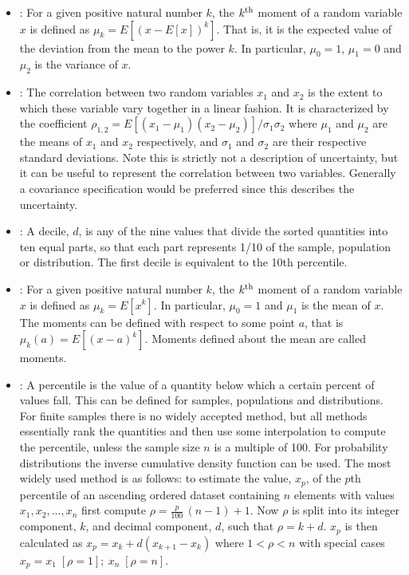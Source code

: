 \documentclass[draftspec]{sbmlpkgspec}
\begin{document}
\begin{itemize}
\item {}:  For a given positive natural number $ k $, the $ k\textsuperscript{th} $  moment of a random variable $ x $ is defined as $ \mu_k = E[(x - E[x])^k] $. That is, it is the expected value of the deviation from the mean to the power $ k $. In particular, $ \mu_0 = 1 $, $ \mu_1 = 0 $ and $ \mu_2 $ is the variance of $ x $.

\item {}:  The correlation between two random variables $ x_1 $ and $ x_2 $ is the extent to which these variable vary together in a linear fashion. It is characterized by the coefficient $ \rho_{1,2} = E[(x_1-\mu_1)(x_2-\mu_2)] / \sigma_1\sigma_2 $ where $ \mu_1 $ and $ \mu_2 $ are the means of $ x_1 $ and $ x_2 $ respectively, and $ \sigma_1 $ and $ \sigma_2 $ are their respective standard deviations. Note this is strictly not a description of uncertainty, but it can be useful to represent the correlation between two variables. Generally a covariance specification would be preferred since this describes the uncertainty.

\item {}:  A decile, $ d $, is any of the nine values that divide the sorted quantities into ten equal parts, so that each part represents 1/10 of the sample, population or distribution. The first decile is equivalent to the 10th percentile.

\item {}:  For a given positive natural number $ k $, the $ k\textsuperscript{th} $ moment of a random variable $ x $ is defined as $ \mu_k = E[x^k] $. In particular, $ \mu_0 = 1 $ and $ \mu_1 $ is the mean of $ x $.
The moments can be defined with respect to some point $ a $, that is $ \mu_k(a) = E[(x - a)^k] $. Moments defined about the mean are called  moments.

\item {}:  A percentile is the value of a quantity below which a certain percent of values fall. This can be defined for samples, populations and distributions. For finite samples there is no widely accepted method, but all methods essentially rank the quantities and then use some interpolation to compute the percentile, unless the sample size $ n $ is a multiple of 100. For probability distributions the inverse cumulative density function can be used.  The most widely used method is as follows: to estimate the value, $ x_p $, of the $ p $th percentile of an ascending ordered dataset containing $ n $ elements with values $ x_1, x_2, ... ,x_n $ first compute $ \rho = \frac{p}{100}\,({n}-1)+1 $. Now $ \rho $ is split into its integer component, $ k $, and decimal component, $ d $, such that $ \rho = k + d $. $ x_p $ is then calculated as $ x_p = x_k+d(x_{k+1}-x_k) $ where $ 1 < \rho < n $ with special cases $ x_p = x_1 \; [\rho=1]; \ x_n \; [\rho=n] $.


\end{itemize}
\end{document}
